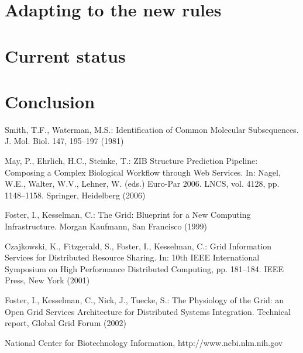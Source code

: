 \documentclass[lnbip]{svmultln}
\begin{document}
\section{Adapting to the new rules}
\label{sec:adapting}

\section{Current status}
\label{sec:nowadays}

\section{Conclusion}
\label{sec:conclusion}

%
%
\begin{thebibliography}{5}

 Smith, T.F., Waterman, M.S.: Identification of Common Molecular
Subsequences. J. Mol. Biol. 147, 195--197 (1981)

 May, P., Ehrlich, H.C., Steinke, T.: ZIB Structure Prediction Pipeline:
Composing a Complex Biological Workflow through Web Services. In: Nagel,
W.E., Walter, W.V., Lehner, W. (eds.) Euro-Par 2006. LNCS, vol. 4128,
pp. 1148--1158. Springer, Heidelberg (2006)

 Foster, I., Kesselman, C.: The Grid: Blueprint for a New Computing
Infrastructure. Morgan Kaufmann, San Francisco (1999)

 Czajkowski, K., Fitzgerald, S., Foster, I., Kesselman, C.: Grid
Information Services for Distributed Resource Sharing. In: 10th IEEE
International Symposium on High Performance Distributed Computing, pp.
181--184. IEEE Press, New York (2001)

 Foster, I., Kesselman, C., Nick, J., Tuecke, S.: The Physiology of the
Grid: an Open Grid Services Architecture for Distributed Systems
Integration. Technical report, Global Grid Forum (2002)

 National Center for Biotechnology Information, http://www.ncbi.nlm.nih.gov

\end{thebibliography}
%
\end{document}
